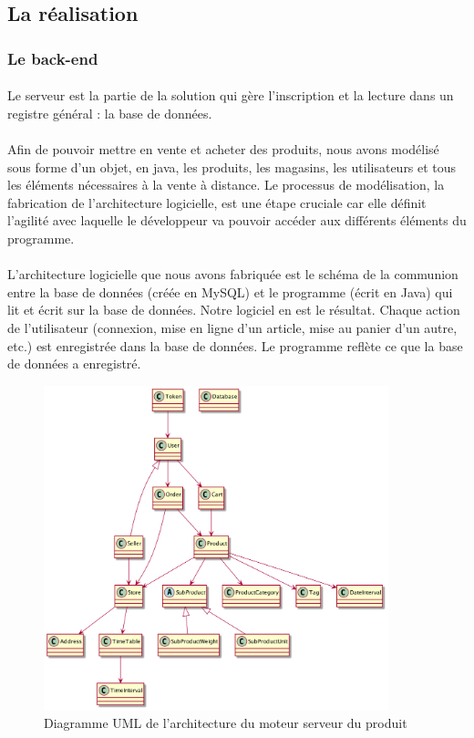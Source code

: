 \documentclass[a4paper, 12pt]{article}
\begin{document}
\subsection{La réalisation}
\subsubsection{Le back-end}

\paragraph{}Le serveur est la partie de la solution qui gère l’inscription et la lecture dans un registre général : la base de données.
\paragraph{}Afin de pouvoir mettre en vente et acheter des produits, nous avons modélisé sous forme d’un objet, en java, les produits, les magasins, les utilisateurs et tous les éléments nécessaires à la vente à distance. Le processus de modélisation, la fabrication de l'architecture logicielle, est une étape cruciale car elle définit l’agilité avec laquelle le développeur va pouvoir accéder aux différents éléments du programme.
\paragraph{}L’architecture logicielle que nous avons fabriquée est le schéma de la communion entre la base de données (créée en MySQL) et le programme (écrit en Java) qui lit et écrit sur la base de données. Notre logiciel en est le résultat. Chaque action de l’utilisateur (connexion, mise en ligne d’un article, mise au panier d’un autre, etc.) est enregistrée dans la base de données. Le programme reflète ce que la base de données a enregistré.

\begin{figure}[H]
	\begin{center}
		\includegraphics[width=10cm]{fig/uml-simplified.png}
		\caption{Diagramme UML de l'architecture du moteur serveur du produit}
		\label{fig:uml-simplified}
	\end{center}
\end{figure}
\end{document}
